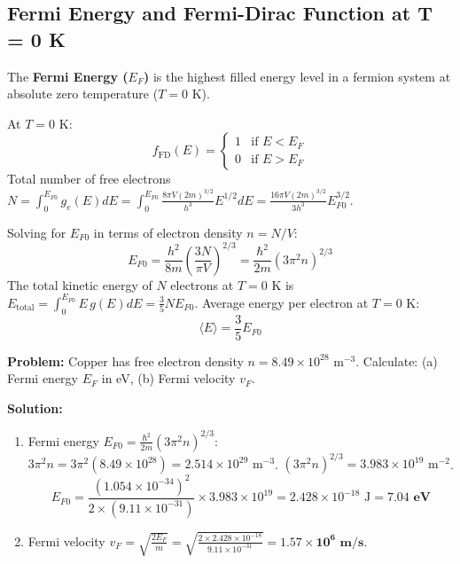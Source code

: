 \documentclass[12pt,a4paper]{article}
\begin{document}
\subsection{Fermi Energy and Fermi-Dirac Function at T = 0 K}

The \textbf{Fermi Energy ($E_F$)} is the highest filled energy level in a fermion system at absolute zero temperature ($T = 0\text{ K}$).

At $T = 0\text{ K}$:
\begin{equation}
f_{\text{FD}}(E) = 
\begin{cases} 
1 & \text{if } E < E_F \\ 
0 & \text{if } E > E_F 
\end{cases}
\end{equation}
Total number of free electrons $N = \int_0^{E_{F0}} g_e(E) dE = \int_0^{E_{F0}} \frac{8\pi V (2m)^{3/2}}{h^3} E^{1/2} dE = \frac{16\pi V (2m)^{3/2}}{3 h^3} E_{F0}^{3/2}$.

\begin{tcolorbox}[formulabox, title={\textbf{Fermi Energy and Average Energy at T = 0 K}}]
Solving for $E_{F0}$ in terms of electron density $n = N/V$:
\begin{equation}
E_{F0} = \frac{h^2}{8m} \left( \frac{3 N}{\pi V} \right)^{2/3} = \frac{\hbar^2}{2m} (3\pi^2 n)^{2/3}
\end{equation}
The total kinetic energy of $N$ electrons at $T = 0\text{ K}$ is $E_{\text{total}} = \int_0^{E_{F0}} E \, g(E) dE = \frac{3}{5} N E_{F0}$.
Average energy per electron at $T = 0\text{ K}$:
\begin{equation}
\langle E \rangle = \frac{3}{5} E_{F0}
\end{equation}
\end{tcolorbox}

\begin{tcolorbox}[examplebox, title={\textbf{Solved Problem 2: Fermi Energy of Copper}}]
\textbf{Problem:} Copper has free electron density $n = 8.49 \times 10^{28}\text{ m}^{-3}$. Calculate: (a) Fermi energy $E_F$ in eV, (b) Fermi velocity $v_F$.

\textbf{Solution:}\par\noindent
\begin{enumerate}[leftmargin=*, itemsep=2pt]
  \item Fermi energy $E_{F0} = \frac{\hbar^2}{2m} (3\pi^2 n)^{2/3}$:
   $3\pi^2 n = 3 \pi^2 (8.49 \times 10^{28}) = 2.514 \times 10^{29}\text{ m}^{-3}$.
   $(3\pi^2 n)^{2/3} = 3.983 \times 10^{19}\text{ m}^{-2}$.
   \begin{equation}
   E_{F0} = \frac{(1.054 \times 10^{-34})^2}{2 \times (9.11 \times 10^{-31})} \times 3.983 \times 10^{19} = 2.428 \times 10^{-18}\text{ J} = \mathbf{7.04\text{ eV}}
   \end{equation}
  \item Fermi velocity $v_F = \sqrt{\frac{2 E_F}{m}} = \sqrt{\frac{2 \times 2.428 \times 10^{-18}}{9.11 \times 10^{-31}}} = \mathbf{1.57 \times 10^6\text{ m/s}}$.
\end{enumerate}
\end{tcolorbox}
\end{document}
